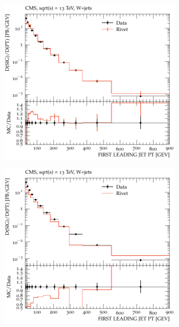 \documentclass{beamer}
\begin{document}
\begin{frame}
\begin{figure}[!h]
	\begin{subfigure}[b]{0.44\textwidth}
		\centering
		\includegraphics[width=\textwidth]{pictures/MCTunig/FIRST_LEADING_JET_PT}
		\caption{\label{FIRST_LEADING_JET_PTTune}}
	\end{subfigure}
	\begin{subfigure}[b]{0.44\textwidth}
		\centering
		\includegraphics[width=\textwidth]{pictures/MCTunig/FIRST_LEADING_JET_PT_Nelson}
		\caption{\label{FIRST_LEADING_JET_PT}}
	\end{subfigure}
	\caption{  }
\end{figure}


\end{frame}
\end{document}
